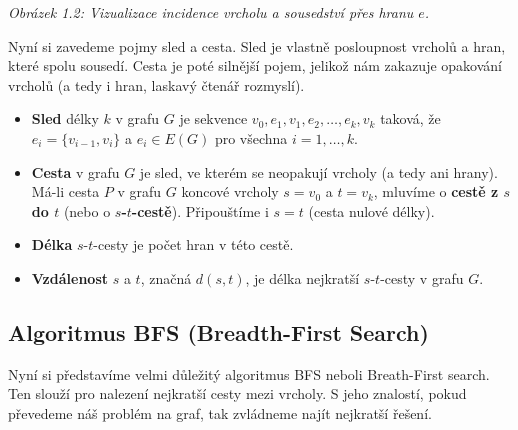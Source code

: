 \begin{center}
\par\medskip
\textit{Obrázek 1.2: Vizualizace incidence vrcholu a sousedství přes hranu $e$.}
\end{center}

\bigskip

\noindent Nyní si zavedeme pojmy sled a cesta. Sled je vlastně posloupnost vrcholů a hran, které spolu sousedí. Cesta je poté silnější pojem, jelikož nám zakazuje opakování vrcholů (a tedy i hran, laskavý čtenář rozmyslí).

\begin{definition}
\leavevmode
\begin{itemize}
\item \textbf{Sled} délky $k$ v grafu $G$ je sekvence $v_0, e_1, v_1, e_2, \dots, e_k, v_k$ taková, že $e_i = \{v_{i-1}, v_i\}$ a $e_i \in E(G)$ pro všechna $i = 1, \dots, k$.
\item \textbf{Cesta} v grafu $G$ je sled, ve kterém se neopakují vrcholy (a tedy ani hrany).
Má-li cesta $P$ v grafu $G$ koncové vrcholy $s = v_0$ a $t = v_k$, mluvíme o \textbf{cestě z $s$ do $t$} (nebo o \textbf{$s$-$t$-cestě}). Připouštíme i $s = t$ (cesta nulové délky).
\item \textbf{Délka} $s$-$t$-cesty je počet hran v této cestě.
\item \textbf{Vzdálenost} $s$ a $t$, značná $d(s, t)$, je délka nejkratší $s$-$t$-cesty v grafu $G$.
\end{itemize}
\end{definition}

\begin{center}
    
\end{center}

\newpage

\subsection{Algoritmus BFS (Breadth-First Search)}

\noindent Nyní si představíme velmi důležitý algoritmus BFS neboli Breath-First search. Ten slouží pro nalezení nejkratší cesty mezi vrcholy. S jeho znalostí, pokud převedeme náš problém na graf, tak zvládneme najít nejkratší řešení. \medskip

